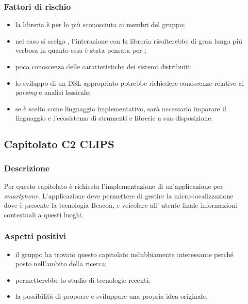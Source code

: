\documentclass[12pt,a4paper]{article}
\begin{document}
\subsubsection{Fattori di rischio}
\begin{itemize}
\item la libreria  è per lo più sconosciuta ai membri del gruppo;
\item nel caso si scelga , l'interazione con la libreria  risulterebbe di gran lunga più verbosa in quanto essa è stata pensata per ;
\item poca conoscenza delle caratteristiche dei sistemi distribuiti;
\item lo sviluppo di un DSL appropriato potrebbe richiedere conoscenze relative al \textit{parsing} e analisi lessicale;
\item se  è scelto come linguaggio implementativo, sarà necessario imparare il linguaggio e l'ecosistema di strumenti e librerie a sua disposizione.
\end{itemize}

\newpage

\subsection{Capitolato C2 CLIPS}

\subsubsection{Descrizione}

Per questo capitolato è richiesta l'implementazione di un'applicazione per \textit{smartphone}. L'applicazione deve permettere di gestire la micro-localizzazione dove è presente la tecnologia  Beacon, e veicolare all' utente finale informazioni contestuali a questi luoghi. 

\subsubsection{Aspetti positivi}
\begin{itemize}
 \item il gruppo ha trovato questo capitolato indubbiamente interessante perché posto nell'ambito della ricerca;
 \item permetterebbe lo studio di tecnologie recenti;
 \item la possibilità di proporre e sviluppare una propria idea originale.
\end{itemize}
\end{document}
